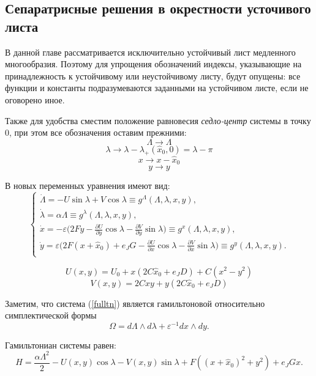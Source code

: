 \subsection{Сепаратрисные решения в окрестности усточивого листа}

    В данной главе рассматривается исключительно устойчивый лист медленного многообразия. Поэтому для упрощения обозначений индексы, указывающие на принадлежность к устойчивому или неустойчивому листу, будут опущены: все функции и константы подразумеваются заданными на устойчивом листе, если не оговорено иное.

Также для удобства сместим положение равновесия \textit{седло-центр} системы в точку $0$, при этом все обозначения оставим прежними:
$$\Lambda \rightarrow \Lambda$$
$$\lambda \rightarrow \lambda - \lambda_+(\hat x_0,0) = \lambda - \pi$$
$$x \rightarrow x - \hat x_0$$
$$y \rightarrow y$$

В новых переменных уравнения имеют вид:
\begin{equation}
    \begin{cases}
        \dot \Lambda = - U \sin \lambda + V \cos \lambda \equiv g^\Lambda(\Lambda,\lambda,x,y), \\
        \dot \lambda = \alpha \Lambda \equiv g^\lambda(\Lambda,\lambda,x,y), \\
        \dot x = -\varepsilon \big( 2Fy-\frac{\partial U}{\partial y} \cos \lambda - \frac{\partial V}{\partial y} \sin \lambda \big) \equiv g^x(\Lambda,\lambda,x,y), \\
        \dot y = \varepsilon \big( 2F(x+\hat x_0)+e_JG -\frac{\partial U}{\partial x} \cos \lambda - \frac{\partial V}{\partial x} \sin \lambda \big) \equiv g^y(\Lambda,\lambda,x,y). \\
    \end{cases}
    \label{fulltn}
\end{equation}

$$U(x,y) = U_0 + x(2C \hat x_0+e_JD)+C(x^2-y^2)$$
$$V(x,y) = 2Cxy+y(2C \hat x_0+e_JD)$$

Заметим, что система (\ref{fulltn}) является гамильтоновой относительно симплектической формы
$$\Omega = d \Lambda \wedge d \lambda + \varepsilon^{-1} dx \wedge dy.$$

Гамильтониан системы равен:
\begin{equation}
H = \frac{\alpha \Lambda^2}{2} - U(x,y)\cos{\lambda} - V(x,y)\sin{\lambda} + F \left((x+\hat x_0)^2+y^2 \right) + e_J G x. 
\label{H}
\end{equation}

